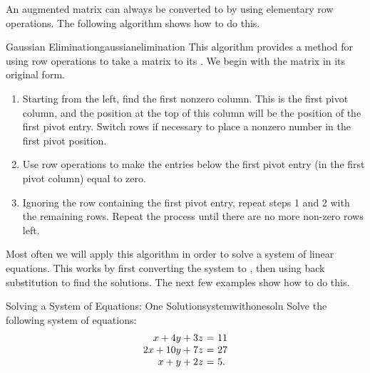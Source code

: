 An augmented matrix can always be converted to {\ef} by using
elementary row operations. The following algorithm shows how to do
this.

\begin{algorithm}{Gaussian Elimination}{gaussianelimination}
  This algorithm provides a method for using row operations to take a
  matrix to its {\ef} .
  We begin with the matrix in its original form.

  \begin{enumerate}
  \item Starting from the left, find the first nonzero column. This is
    the first pivot column, and the position at the top of this column
    will be the position of the first pivot entry. Switch rows if
    necessary to place a nonzero number in the first pivot position.

  \item Use row operations to make the entries below the first pivot
    entry (in the first pivot column) equal to zero.

  \item Ignoring the row containing the first pivot entry, repeat
    steps 1 and 2 with the remaining rows.  Repeat the process until
    there are no more non-zero rows left.

  \end{enumerate}
\end{algorithm}

Most often we will apply this algorithm in order to solve a system of
linear equations. This works by first converting the system to {\ef},
then using back substitution to find the solutions. The next few
examples show how to do this.

\begin{example}{Solving a System of Equations: One Solution}{systemwithonesoln}
  Solve the following system of equations:
  \begin{equation*}
    \begin{array}{r@{~}c@{~}l}
      x+4y+3z &=& 11\\
      2x+10y+7z &=& 27\\
      x+y+2z &=& 5.
    \end{array}
  \end{equation*}
\end{example}

